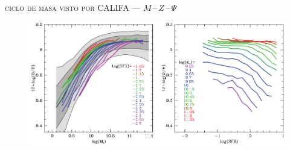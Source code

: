 \documentclass[xcolor=dvipsnames,4pt,hyperref={colorlinks,citecolor=black,linkcolor=black,urlcolor=black}]{beamer}
\begin{document}
\begin{frame}{\textsc{ciclo de masa visto por CALIFA --- $M\,$--$\,Z\,$--$\,\Psi$}}

\begin{figure}
\includegraphics[scale=1]{img/mannucci2010-1}
\end{figure}
\end{frame}
\end{document}
